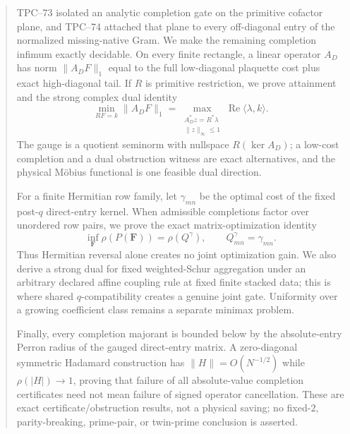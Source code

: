 \begin{abstract}
TPC--73 isolated an analytic completion gate on the primitive cofactor
plane, and TPC--74 attached that plane to every off-diagonal entry of the
normalized missing-native Gram.  We make the remaining completion
infimum exactly decidable.  On every finite rectangle, a linear operator
\(A_D\) has norm \(\|A_DF\|_1\) equal to the full low-diagonal
plaquette cost plus exact high-diagonal tail.  If \(R\) is primitive
restriction, we prove attainment and the strong complex dual identity
\[
 \min_{RF=k}\|A_DF\|_1
 =
 \max_{\substack{A_D^*z=R^*\lambda\\\|z\|_\infty\le1}}
 \operatorname{Re}\langle\lambda,k\rangle .
\]
The gauge is a quotient seminorm with nullspace \(R(\ker A_D)\); a
low-cost completion and a dual obstruction witness are exact
alternatives, and the physical M\"obius functional is one feasible dual
direction.

For a finite Hermitian row family, let \(\gamma_{mn}\) be the optimal
cost of the fixed post-\(q\) direct-entry kernel.  When admissible completions
factor over unordered row pairs, we prove the exact matrix-optimization identity
\[
 \inf_{\boldsymbol F}\rho(P(\boldsymbol F))
 =
 \rho(Q^\gamma),
 \qquad
 Q^\gamma_{mn}=\gamma_{mn}.
\]
Thus Hermitian reversal alone creates no joint optimization gain.  We
also derive a strong dual for fixed weighted-Schur aggregation under an
arbitrary declared affine coupling rule at fixed finite stacked data;
this is where shared \(q\)-compatibility creates a genuine joint gate.
Uniformity over a growing coefficient class remains a separate minimax
problem.

Finally, every completion majorant is bounded below by the
absolute-entry Perron radius of the gauged direct-entry matrix.  A
zero-diagonal symmetric Hadamard construction has
\(\|H\|=O(N^{-1/2})\) while \(\rho(|H|)\to1\), proving that failure of
all absolute-value completion certificates need not mean failure of
signed operator cancellation.  These are exact certificate/obstruction
results, not a physical saving; no fixed-\(2\), parity-breaking,
prime-pair, or twin-prime conclusion is asserted.
\end{abstract}
